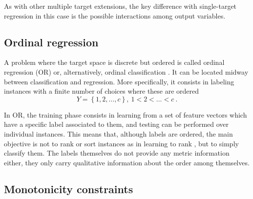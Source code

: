 As with other multiple target extensions, the key difference with single-target regression in this case is the possible interactions among output variables.

  
\subsection{Ordinal regression}

A problem where the target space is discrete but ordered is called ordinal regression (OR) or, alternatively, ordinal classification . It can be located midway between classification and regression. More specifically, it consists in labeling instances with a finite number of choices where these are ordered
\begin{equation}
Y=\left\{1,2,\dots,c\right\},~1<2<\dots<c~.
\end{equation}

In OR, the training phase consists in learning from a set of feature vectors which have a specific label associated to them, and testing can be performed over individual instances. This means that, although labels are ordered, the main objective is not to rank or sort instances as in learning to rank , but to simply classify them. The labels themselves do not provide any metric information either, they only carry qualitative information about the order among themselves.

\subsection{Monotonicity constraints}

